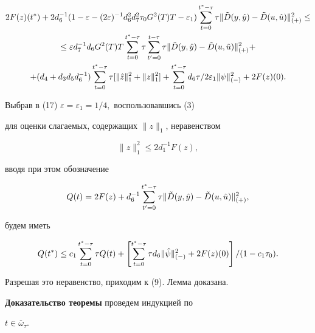 \begin{gather} 


2F(z)(t^*)+2d_6^{-1}(1-\varepsilon-(2\varepsilon)^{-1}d_6^2 d_7^2 \tau_0 


G^2(T)T-\varepsilon_1)\sum^{t^*-\tau}_{t=0}\tau


\|\Tilde D(y,\Hat y)-\Tilde D(u,\Hat u)\|^2_{(+)}\le \notag \\ 


%


\le \varepsilon d_7^{-1} d_6 G^2(T)T \sum^{t^*-\tau}_{t=0}\tau 


\sum^{t-\tau}_{t'=0}\tau


\|\Tilde D(y,\Hat y)-\Tilde D(u,\Hat u)\|^2_{(+)} + \notag \\ 


%


+(d_4+d_3d_5d_6^{-1})\sum^{t^*-\tau}_{t=0}\tau [\|\Hat z\|^2_1+\|z\|^2_1]+ 


\sum^{t^*-\tau}_{t=0}d_6\tau/2\varepsilon_1\|\psi\|^2_{(-)}+2F(z)(0). 


\end{gather} 


Выбрав в (17) $\varepsilon=\varepsilon_1=1/4,$ воспользовавшись (3) 


для оценки слагаемых, содержащих $\|z\|_1$, неравенством


$$ 


\|z\|^2_1 \le 2d_1^{-1}F(z),


$$ 


вводя при этом обозначение 


$$ 


Q(t)=2F(z)+d_6^{-1}\sum^{t^*-\tau}_{t'=0}\tau 


\|\Tilde D(y,\Hat y)-\Tilde D(u,\Hat u)\|^2_{(+)}, 


$$ 


будем иметь 


$$ 


Q(t^*) \le c_1 \sum^{t^*-\tau}_{t=0}\tau Q(t)+ 


\left[ \sum^{t^*-\tau}_{t=0}\tau d_6\|\Hat \psi\|^2_{(-)} 


+2F(z)(0)\right] /(1-c_1\tau_0). 


$$ 


Разрешая это неравенство, приходим к (9). Лемма доказана. 


 


{\bf Доказательство теоремы} проведем индукцией по


$t\in \overline \omega_\tau.$ 


